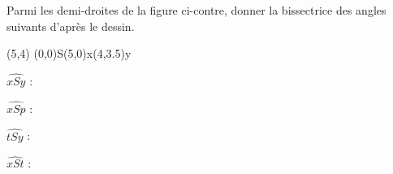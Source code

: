 Parmi les demi-droites de la figure ci-contre, donner la
bissectrice des angles suivants d'après le dessin.
\begin{multicols}{2}
\begin{center}
\pspicture(5,4)
    \pstGeonode[PointSymbol=none,PosAngle={235,0,45}](0,0){S}(5,0){x}(4,3.5){y}
     
\endpspicture
\end{center}
\par\columnbreak\par
    \begin{myenumerate}
        \item $\widehat{xSy}$ : \dotfill
        \item $\widehat{xSp}$ : \dotfill
        \item $\widehat{tSy}$ : \dotfill
        \item $\widehat{xSt}$ : \dotfill
    \end{myenumerate}
\end{multicols}